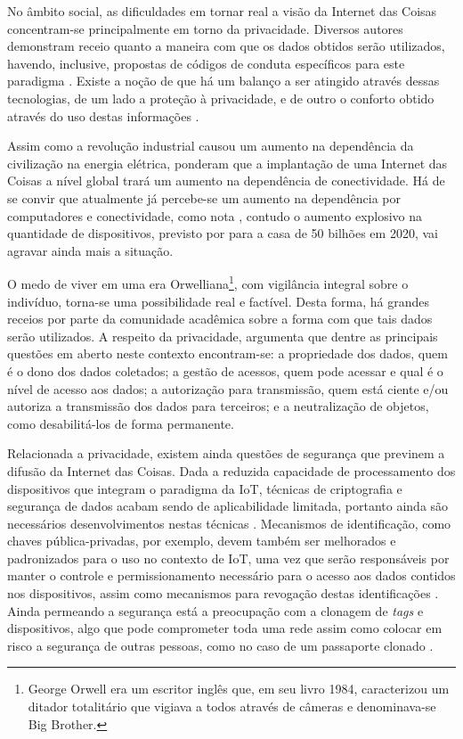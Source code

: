 \documentclass[twoside,english,brazilian]{UNISINOSmonografia}
\begin{document}
No âmbito social, as dificuldades em tornar real a visão da Internet das 
Coisas concentram-se principalmente em torno da privacidade.
Diversos autores demonstram receio quanto a maneira com que os dados obtidos 
serão utilizados, havendo, inclusive, propostas de códigos de conduta 
específicos para este paradigma \cite{ITU2005}.
Existe a noção de que há um balanço a ser atingido através dessas tecnologias, 
de um lado a proteção à privacidade, e de outro o conforto obtido através do 
uso destas informações \cite{Atzori2010b}.


Assim como a revolução industrial causou um aumento na dependência da 
civilização na energia elétrica,  ponderam que a 
implantação de uma Internet das Coisas a nível global trará um aumento na 
dependência de conectividade.
Há de se convir que atualmente já percebe-se um aumento na dependência por 
computadores e conectividade, como nota , contudo o 
aumento explosivo na quantidade de dispositivos, previsto por 
 para a casa de 50 bilhões em 2020, vai agravar ainda 
mais a situação.


O medo de viver em uma era Orwelliana\footnote{
	George Orwell era um escritor inglês que, em seu livro 1984, caracterizou 
	um ditador totalitário que vigiava a todos através de câmeras e 
	denominava-se Big Brother.
}, com vigilância integral sobre o indivíduo, torna-se uma possibilidade real 
e factível.
Desta forma, há grandes receios por parte da comunidade acadêmica sobre a 
forma com que tais dados serão utilizados. 
A respeito da privacidade,  argumenta que dentre as 
principais questões em aberto neste contexto encontram-se: a propriedade dos 
dados, quem é o dono dos dados coletados; a gestão de acessos, quem pode 
acessar e qual é o nível de acesso aos dados; a autorização para transmissão, 
quem está ciente e/ou autoriza a transmissão dos dados para terceiros; e a 
neutralização de objetos, como desabilitá-los de forma permanente.


Relacionada a privacidade, existem ainda questões de segurança que previnem a 
difusão da Internet das Coisas.
Dada a reduzida capacidade de processamento dos dispositivos que integram o 
paradigma da IoT, técnicas de criptografia e segurança de dados acabam sendo 
de aplicabilidade limitada, portanto ainda são necessários desenvolvimentos 
nestas técnicas \cite{Sundmaeker2010}.
Mecanismos de identificação, como chaves pública-privadas, por exemplo, devem 
também ser melhorados e padronizados para o uso no contexto de IoT, uma vez 
que serão responsáveis por manter o controle e permissionamento necessário 
para o acesso aos dados contidos nos dispositivos, assim como mecanismos para 
revogação destas identificações \cite{Buckley2006}.
Ainda permeando a segurança está a preocupação com a clonagem de \textit{tags} 
e dispositivos, algo que pode comprometer toda uma rede assim como colocar em 
risco a segurança de outras pessoas, como no caso de um passaporte clonado 
\cite{ITU2005}. 
\end{document}
